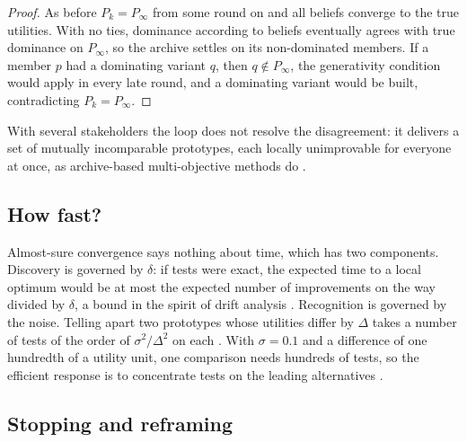 \documentclass[preprint,review,11pt,authoryear]{elsarticle}
\newcommand{\Pk}{P_k}
\theoremstyle{definition}
\begin{document}
\begin{proof}
As before $\Pk=P_\infty$ from some round on and all beliefs converge to the true utilities. With no ties, dominance according to beliefs eventually agrees with true dominance on $P_\infty$, so the archive settles on its non-dominated members. If a member $p$ had a dominating variant $q$, then $q\notin P_\infty$, the generativity condition would apply in every late round, and a dominating variant would be built, contradicting $\Pk=P_\infty$.
\end{proof}

With several stakeholders the loop does not resolve the disagreement: it delivers a set of mutually incomparable prototypes, each locally unimprovable for everyone at once, as archive-based multi-objective methods do \citep{laumanns2002}.

\subsection{How fast?}
\label{sec:rates}

Almost-sure convergence says nothing about time, which has two components. Discovery is governed by $\delta$: if tests were exact, the expected time to a local optimum would be at most the expected number of improvements on the way divided by $\delta$, a bound in the spirit of drift analysis \citep{heyao2001}. Recognition is governed by the noise. Telling apart two prototypes whose utilities differ by $\Delta$ takes a number of tests of the order of $\sigma^2/\Delta^2$ on each \citep{evendar2006, mannor2004}. With $\sigma=0.1$ and a difference of one hundredth of a utility unit, one comparison needs hundreds of tests, so the efficient response is to concentrate tests on the leading alternatives \citep{chen2000}.

\subsection{Stopping and reframing}
\label{sec:reframe}
\end{document}
